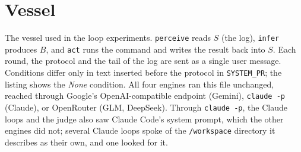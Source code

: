 \documentclass{article}
\begin{document}
\section{Vessel}\label{app:code}
The vessel used in the loop experiments. \texttt{perceive} reads $S$ (the
log), \texttt{infer} produces $B$, and \texttt{act} runs the command and
writes the result back into $S$. Each round, the protocol and the tail of the
log are sent as a single user message. Conditions differ only in text inserted
before the protocol in \texttt{SYSTEM\_PR}; the listing shows the \emph{None}
condition. All four engines ran this file unchanged, reached through Google's
OpenAI-compatible endpoint (Gemini), \texttt{claude -p} (Claude), or OpenRouter
(GLM, DeepSeek). Through \texttt{claude -p}, the Claude loops and the judge also
saw Claude Code's system prompt, which the other engines did not; several Claude
loops spoke of the \texttt{/workspace} directory it describes as their own, and
one looked for it.


\end{document}
